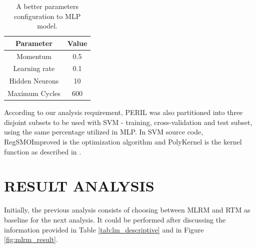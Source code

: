 \documentclass[a4paper,twoside]{article}
\begin{document}
\begin{table}[h]
\caption{A better parameters configuration to MLP model.}\label{tab:mlp_best_configuration} \centering
\begin{tabular}{|c|c|}
  \hline
  Parameter & Value \\
  \hline
  Momentum & 0.5 \\
  \hline
  Learning rate & 0.1 \\
  \hline
  Hidden Neurons & 10 \\
  \hline
  Maximum Cycles & 600 \\
  \hline
\end{tabular}
\end{table}

According to our analysis requirement, PERIL was also partitioned into three disjoint subsets to be used with SVM - training, cross-validation and test subset, using the same percentage utilized in MLP. In SVM source code, RegSMOImproved is the optimization algorithm and PolyKernel is the kernel function as described in \cite{Shevade1999}. 

\section{\uppercase{Result Analysis}}
\label{sec:resultanalysis}

\noindent Initially, the previous analysis consists of choosing between MLRM and RTM as baseline for the next analysis. It could be performed after discussing the information provided in Table \ref{tab:lm_descriptive} and in Figure \ref{fig:mlrm_result}. 
\end{document}
